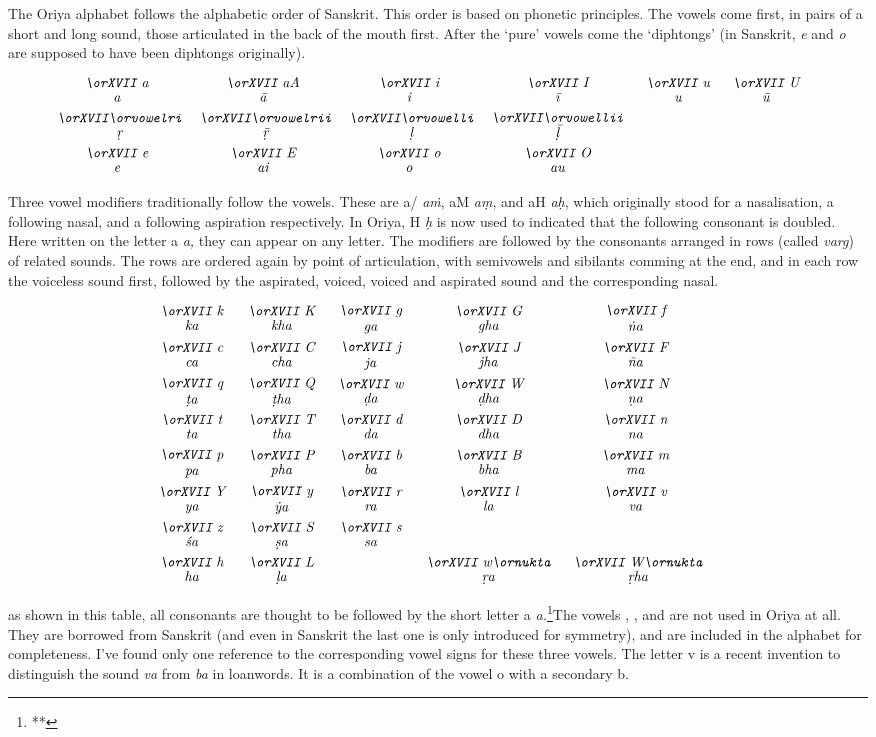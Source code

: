 The Oriya alphabet follows the alphabetic order of Sanskrit. This
order is based on phonetic principles. The vowels come first, in pairs of 
a short and long sound, those articulated in the
back of the mouth first. After the `pure' vowels come the `diphtongs'
(in Sanskrit, {\it e} and
{\it o} are supposed to have been diphtongs originally).

\def\OB#1#2{$\hbox{\orXVII#1}\atop\hbox{\strut\it#2}$}

$$
\vbox{\halign{\it\hfill#\hfill\quad&&\it\hfill#\hfill\quad\cr
\OB{a}{a}	&\OB{aA}{\=a}	&\OB{i}{i}	&\OB{I}{\=\i}	&\OB{u}{u}	&\OB{U}{\=u}	\cr\noalign{\smallskip}
\OB{\orvowelri}{\d r}&\OB{\orvowelrii}{\d{\=r}}&\OB{\orvowelli}{\d l}&\OB{\orvowellii}{\d{\=l}}	\cr\noalign{\smallskip}
\OB{e}{e}	&\OB{E}{ai}	&\OB{o}{o}	&\OB{O}{au}	\cr
}}
$$

\noindent Three vowel modifiers traditionally follow the vowels. These are
{\or a/} {\it a\.m}, {\or aM} {\it a\d{m}}, and {\or aH} {\it a\d{h}},
which originally stood for a nasalisation, a following
nasal, and a following aspiration respectively. 
In Oriya, {\or H} {\it \d h} is now used to indicated that the following consonant
is doubled.
Here written on the letter {\or a} {\it a,}
they can appear on any letter. The modifiers are 
followed by the consonants arranged in rows (called {\it varg}) of related sounds. The rows are ordered
again by point of articulation, with semivowels and sibilants comming at the end, 
and in each row the voiceless sound first, followed by the aspirated, voiced,
voiced and aspirated sound and the corresponding nasal.

$$
\vbox{\halign{\it\hfill#\hfill\quad&&\it\hfill#\hfill\quad\cr
\OB{k}{ka}	&\OB{K}{kha}	&\OB{g}{ga}	&\OB{G}{gha}	&\OB{f}{\.na}	\cr\noalign{\smallskip}
\OB{c}{ca}	&\OB{C}{cha}	&\OB{j}{ja}	&\OB{J}{jha}	&\OB{F}{\~na}	\cr\noalign{\smallskip}
\OB{q}{\d ta}	&\OB{Q}{\d tha}	&\OB{w}{\d da}	&\OB{W}{\d dha}	&\OB{N}{\d na}	\cr\noalign{\smallskip}
\OB{t}{ta}	&\OB{T}{tha}	&\OB{d}{da}	&\OB{D}{dha}	&\OB{n}{na}	\cr\noalign{\smallskip}
\OB{p}{pa}	&\OB{P}{pha}	&\OB{b}{ba}	&\OB{B}{bha}	&\OB{m}{ma}	\cr\noalign{\smallskip}
\OB{Y}{ya}	&\OB{y}{\.ya}	&\OB{r}{ra}	&\OB{l}{la}	&\OB{v}{va}	\cr\noalign{\smallskip}
\OB{z}{\'sa}	&\OB{S}{\d sa}	&\OB{s}{sa}					\cr\noalign{\smallskip}
\OB{h}{ha}	&\OB{L}{\d la}	&	&\OB{w\ornukta}{\d{r}a}	&\OB{W\ornukta}{\d{r}ha}\cr
}}
$$

\noindent as shown in this table, all consonants are thought to be followed by the
short letter {\or a} {\it a.}\footnote{**}{The vowels {\or\orvowelrii, \orvowelli,}
and {\or\orvowellii} are not used in Oriya at all. They are borrowed from Sanskrit
(and even in Sanskrit the last one is only introduced for symmetry), and are
included in the alphabet for completeness. I've found only one reference to
the corresponding vowel signs for these three vowels. The letter {\or v} is a
recent invention to distinguish the sound {\it va} from {\it ba} in loanwords.
It is a combination of the vowel {\or o} with a secondary {\or b}.}

